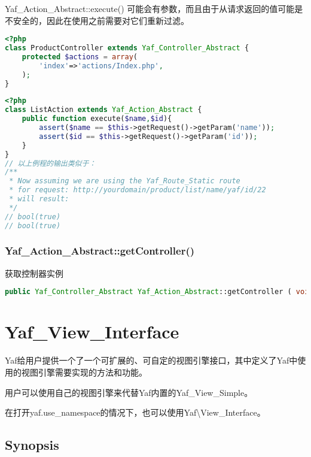 Yaf\_Action\_Abstract::execute() 可能会有参数，而且由于从请求返回的值可能是不安全的，因此在使用之前需要对它们重新过滤。



\begin{lstlisting}[language=PHP]
<?php
class ProductController extends Yaf_Controller_Abstract {
    protected $actions = array(
        'index'=>'actions/Index.php',
    );
}
\end{lstlisting}



\begin{lstlisting}[language=PHP]
<?php
class ListAction extends Yaf_Action_Abstract {
    public function execute($name,$id){
        assert($name == $this->getRequest()->getParam('name'));
        assert($id == $this->getRequest()->getParam('id'));
    }
}
// 以上例程的输出类似于：
/**
 * Now assuming we are using the Yaf_Route_Static route 
 * for request: http://yourdomain/product/list/name/yaf/id/22
 * will result:
 */
// bool(true)
// bool(true)
\end{lstlisting}




\subsection{Yaf\_Action\_Abstract::getController()}

获取控制器实例



\begin{lstlisting}[language=PHP]
public Yaf_Controller_Abstract Yaf_Action_Abstract::getController ( void )
\end{lstlisting}





\chapter{Yaf\_View\_Interface}

Yaf给用户提供一个了一个可扩展的、可自定的视图引擎接口，其中定义了Yaf中使用的视图引擎需要实现的方法和功能。


用户可以使用自己的视图引擎来代替Yaf内置的Yaf\_View\_Simple。

在打开yaf.use\_namespace的情况下，也可以使用Yaf\textbackslash View\_Interface。

\section{Synopsis}


